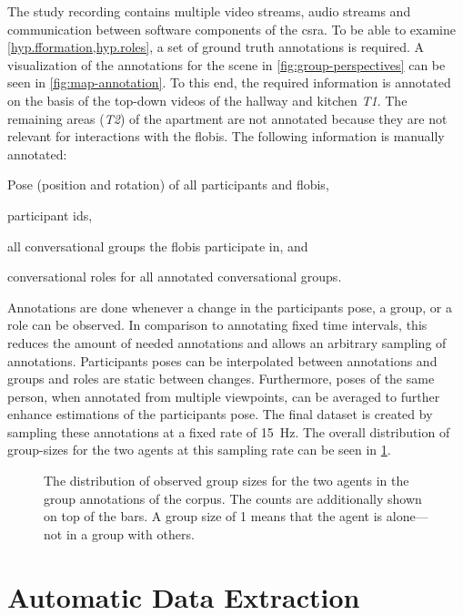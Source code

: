 The study recording contains multiple video streams, audio streams and communication between software components of the \gls{csra}.
To be able to examine \cref{hyp.fformation,hyp.roles}, a set of ground truth annotations is required. 
A visualization of the annotations for the scene in \cref{fig:group-perspectives} can be seen in \cref{fig:map-annotation}.
To this end, the required information is annotated on the basis of the top-down videos of the hallway and kitchen \emph{T1}.
The remaining areas (\emph{T2}) of the \gls{apartment} are not annotated because they are not relevant for interactions with the \glspl{flobi}.
The following information is manually annotated:
\begin{enumerate*}[label=(\arabic*)]
    \item Pose (position and rotation) of all participants and \glspl{flobi},
    \item participant ids,
    \item all \glspl{conversational group} the \glspl{flobi} participate in, and
    \item \glspl{conversational role} for all annotated \glspl{conversational group}.
\end{enumerate*}
Annotations are done whenever a change in the participants pose, a group, or a role can be observed.
In comparison to annotating fixed time intervals, this reduces the amount of needed annotations and allows an arbitrary sampling of annotations.
Participants poses can be interpolated between annotations and groups and roles are static between changes.
Furthermore, poses of the same person, when annotated from multiple viewpoints, can be averaged to further enhance estimations of the participants pose.
The final dataset is created by sampling these annotations at a fixed rate of \SI{15}{\Hz}.
The overall distribution of group-sizes for the two agents at this sampling rate can be seen in \cref{fig:group-sizes}.
\begin{figure}[htb]
    \centering
    
    \caption[Distribution of group sizes of agents.]{\label{fig:group-sizes}
    The distribution of observed group sizes for the two agents in the group annotations of the corpus.
    The counts are additionally shown on top of the bars.
    A group size of 1 means that the agent is alone---not in a group with others.
    }
\end{figure}

\section{Automatic Data Extraction}\label{sec.group.extraction}

